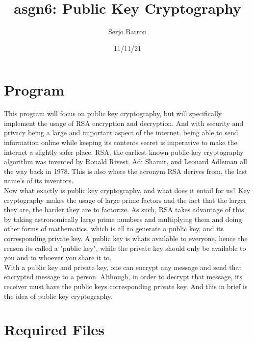 \documentclass[
	12pt, %
]{fphw}
\title{asgn6: Public Key Cryptography} %
\author{Serjo Barron} %
\date{11/11/21} %
\begin{document}
\maketitle %


\section{Program}

\hspace{15pt} This program will focus on public key cryptography, but will specifically implement the usage of RSA encryption and decryption. And with security and privacy being a large and important aspect of the internet, being able to send information online while keeping its contents secret is imperative to make the internet a slightly safer place. RSA, the earliest known public-key cryptography algorithm was invented by Ronald Rivest, Adi Shamir, and Leonard Adleman all the way back in 1978. This is also where the acronym RSA derives from, the last name's of its inventors. \\
Now what exactly is public key cryptography, and what does it entail for us? Key cryptography makes the usage of large prime factors and the fact that the larger they are, the harder they are to factorize. As such, RSA takes advantage of this by taking astronomically large prime numbers and multiplying them and doing other forms of mathematics, which is all to generate a public key, and its corresponding private key. A public key is whats available to everyone, hence the reason its called a "public key", while the private key should only be available to you and to whoever you share it to. \\
With a public key and private key, one can encrypt any message and send that encrypted message to a person. Although, in order to decrypt that message, its receiver must have the public keys corresponding private key. And this in brief is the idea of public key cryptography.

\section{Required Files}
\end{document}
